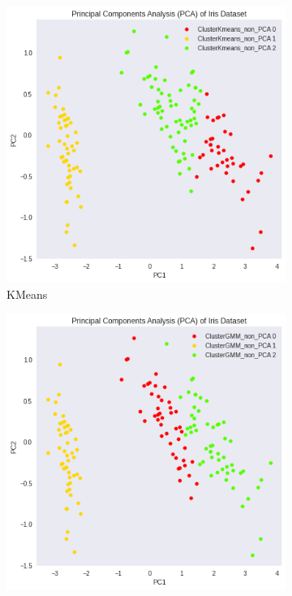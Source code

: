 \documentclass{homework}
\begin{document}
\begin{figure}[hbt!]
     \centering
     \begin{subfigure}[b]{0.3\textwidth}
         \centering
         \includegraphics[width=\textwidth]{kmeans_non_pca.png}
         \caption{KMeans}
     \end{subfigure}
     \hfill
     \begin{subfigure}[b]{0.3\textwidth}
         \centering
         \includegraphics[width=\textwidth]{EM_non_pca.png}

\end{subfigure}
\end{figure}
\end{document}
